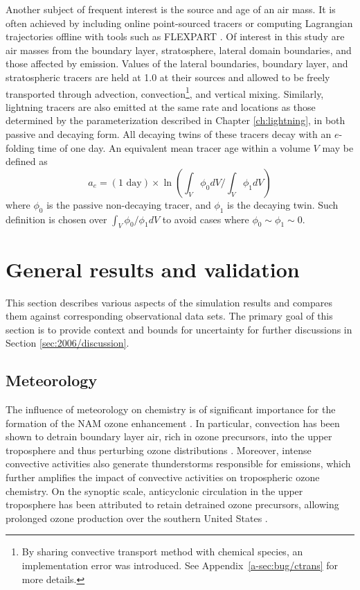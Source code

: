 	Another subject of frequent interest is the source and age of an air mass. It is often achieved by including online point-sourced tracers or computing Lagrangian trajectories offline with tools such as FLEXPART \citep{Stohl:2005vn}. Of interest in this study are air masses from the boundary layer, stratosphere, lateral domain boundaries, and those affected by {\lnox} emission. Values of the lateral boundaries, boundary layer, and stratospheric tracers are held at 1.0 at their sources and allowed to be freely transported through advection, convection\footnote{By sharing convective transport method with chemical species, an implementation error was introduced. See \mbox{Appendix}~\ref{a-sec:bug/ctrans} for more details.}, and vertical mixing. Similarly, lightning tracers are also emitted at the same rate and locations as those determined by the {\lnox} parameterization described in Chapter \ref{ch:lightning}, in both passive and decaying form. All decaying twins of these tracers decay with an $e$-folding time of one day. An equivalent mean tracer age within a volume $V$ may be defined as
	\begin{equation}\label{eqn:tracer-age}
		a_e = (\mbox {1 day})\times\ln\left(\int_V{\phi_0}dV/\int_V\phi_1dV\right)
	\end{equation}
	where $\phi_0$ is the passive non-decaying tracer, and $\phi_1$ is the decaying twin. Such definition is chosen over $\int_V\phi_0/\phi_1dV$ to avoid cases where $\phi_0\sim\phi_1\sim0$.

%
%
\section{General results and validation}\label{sec:2006/general}

This section describes various aspects of the simulation results and compares them against
corresponding observational data sets. The primary goal of this section is to provide context
and bounds for uncertainty for further discussions in Section \ref{sec:2006/discussion}.

\subsection{Meteorology}\label{ssec:2006/gen/met}

The influence of meteorology on chemistry is of significant importance for the formation of the NAM
ozone enhancement \citep{Li:2005ss,Cooper:2007cr,Barth:2012qf}. In particular, convection has
been shown to detrain boundary layer air, rich in ozone precursors, into the upper troposphere and
thus perturbing ozone distributions \citep{Dickerson:1987hc,Kar:2004jl,Weinstock:2007yj}. Moreover,
intense convective activities also generate thunderstorms responsible for {\lnox} emissions, which
further amplifies the impact of convective activities on tropospheric ozone chemistry. On the synoptic
scale, anticyclonic circulation in the upper troposphere has been attributed to retain detrained ozone
precursors, allowing prolonged ozone production over the southern United States
\citep{Li:2005ss,Cooper:2007cr}.

